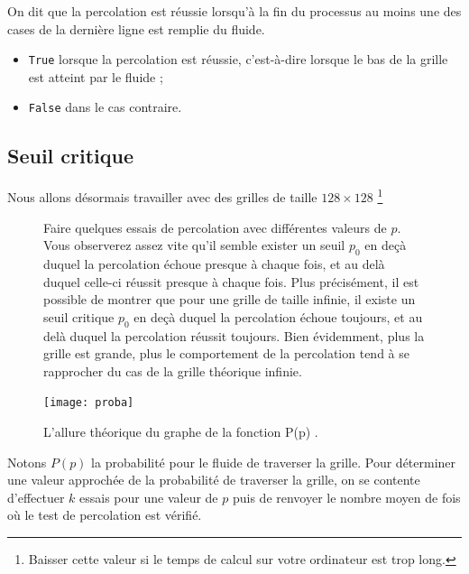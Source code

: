 On dit que la percolation est réussie lorsqu'à la fin du processus au
moins une des cases de la dernière ligne est remplie du fluide.

\question{Écrire une fonction \texttt{teste\_percolation(p,n)} qui prend en argument
un réel $p\in\left[0,1\right[$ et un entier $n\in \mathbb{N}^*$, crée une grille, effectue 
la percolation et
retourne :}
\begin{itemize}
\item \texttt{True} lorsque la percolation est réussie, c'est-à-dire lorsque le bas
  de la grille est atteint par le fluide ;
\item \texttt{False} dans le cas contraire.
\end{itemize}

%
\subsection*{Seuil critique}\label{seuil-critique}
%
Nous allons désormais travailler avec des grilles de taille $128\times 128$ \footnote{Baisser cette valeur si le temps de calcul sur votre ordinateur est trop long.}

\begin{figure}[!htb]
\begin{minipage}{0.5\textwidth}
Faire quelques essais de percolation avec différentes valeurs de $p$. Vous observerez assez vite qu'il semble exister un seuil $p_0$ en deçà duquel la percolation
échoue presque à chaque fois, et au delà duquel celle-ci réussit presque
à chaque fois. Plus précisément, il est possible de montrer que pour une
grille de taille infinie, il existe un seuil critique
$p_0$ en deçà duquel la percolation échoue toujours,
et au delà duquel la percolation réussit toujours. Bien évidemment, plus
la grille est grande, plus le comportement de la percolation tend à se
rapprocher du cas de la grille théorique infinie.
\end{minipage}
\begin{minipage}{0.5\textwidth}
\begin{center}
\texttt{[image: proba]}
\caption{L'allure théorique du graphe de la fonction P(p) \label{fig3}.}
\end{center}
\end{minipage}
\end{figure}


Notons $P(p)$ la probabilité pour le fluide de traverser la grille. Pour déterminer une valeur approchée de la probabilité de traverser la grille, on se contente d'effectuer $k$ essais pour une valeur de $p$ puis de renvoyer le nombre moyen de fois où le test de percolation est vérifié.

